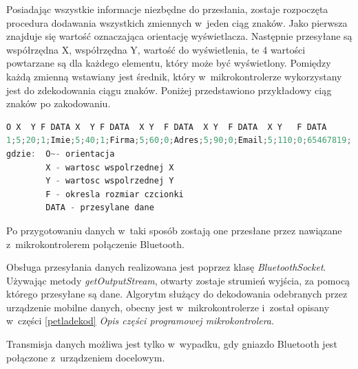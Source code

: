 \documentclass[a4paper,12pt, twoside]{article}
\begin{document}
    	Posiadając wszystkie informacje niezbędne do przesłania, zostaje rozpoczęta procedura dodawania wszystkich zmiennych w~jeden ciąg znaków. Jako pierwsza znajduje się wartość oznaczająca orientację wyświetlacza. Następnie przesyłane są współrzędna X, współrzędna Y, wartość do wyświetlenia, te 4 wartości powtarzane są dla każdego elementu, który może być wyświetlony. Pomiędzy każdą zmienną wstawiany jest średnik, który w~mikrokontrolerze wykorzystany jest do zdekodowania ciągu znaków. Poniżej przedstawiono przykładowy ciąg znaków po zakodowaniu.
    	\begin{lstlisting}[language=C++, label={lst:przykladowePrzesylaneDane}, caption=Przykładowy ciąg przesyłanych danych]
O X  Y F DATA X  Y F DATA  X Y  F DATA  X Y  F DATA  X Y   F DATA	
1;5;20;1;Imie;5;40;1;Firma;5;60;0;Adres;5;90;0;Email;5;110;0;65467819;
gdzie:  O~- orientacja
        X - wartosc wspolrzednej X
        Y - wartosc wspolrzednej Y
        F - okresla rozmiar czcionki
        DATA - przesylane dane\end{lstlisting}
    
    	Po przygotowaniu danych w~taki sposób zostają one przesłane przez nawiązane z~mikrokontrolerem połączenie Bluetooth.

    	Obsługa przesyłania danych realizowana jest poprzez klasę \textit{BluetoothSocket}. Używając metody \textit{getOutputStream}\cite{outputstream}, otwarty zostaje strumień wyjścia, za pomocą którego przesyłane są dane. Algorytm służący do dekodowania odebranych przez urządzenie mobilne danych, obecny jest w~mikrokontrolerze i~został opisany w~części \ref{petladekod} \textit{Opis części programowej mikrokontrolera}.
    	
    	Transmisja danych możliwa jest tylko w~wypadku, gdy gniazdo Bluetooth jest połączone z~urządzeniem docelowym.
	
\end{document}
